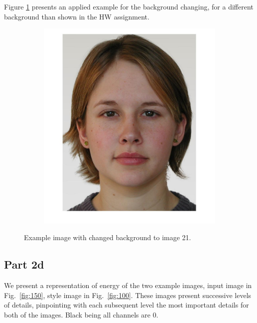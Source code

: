 \documentclass[a4paper]{iacas}
\begin{document}
Figure \ref{fig:BG_Changed} presents an applied example for the background changing, for a different background than shown in the HW assignment.

\begin{figure}[!htbp]
	\centering
	\begin{subfigure}[b]{0.48\textwidth}
		
		\includegraphics[width=\textwidth]{BG_Changed.jpg}
		
	\end{subfigure}
	\caption{Example image with changed background to image 21.}
	\label{fig:BG_Changed}

\end{figure}

\subsection{Part 2d}

We present a representation of energy of the two example images, input image in Fig.~\ref{fig:150}, style image in Fig.~\ref{fig:100}. These images present successive levels of details, pinpointing with each subsequent level the most important details for both of the images. Black being all channels are 0.
\end{document}

